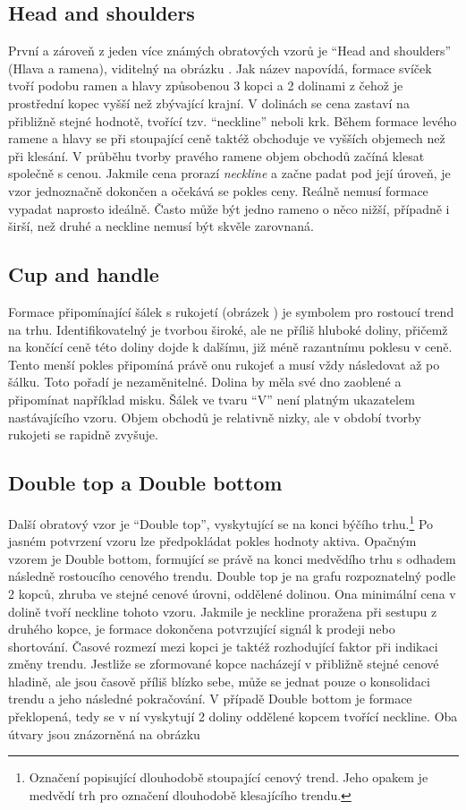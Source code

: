 \subsection{Head and shoulders}
První a zároveň z jeden více známých obratových vzorů je \enquote{Head and shoulders} (Hlava a ramena), viditelný na obrázku \iffalse TODO: Dat obrazek \fi. Jak název napovídá, formace svíček tvoří podobu ramen a hlavy způsobenou
3 kopci a 2 dolinami z čehož je prostřední kopec vyšší než zbývající krajní. V dolinách se cena zastaví na přibližně stejné hodnotě, tvořící tzv. \enquote{neckline} neboli krk.
Během formace levého ramene a hlavy se při stoupající ceně taktéž obchoduje ve vyšších objemech než při klesání. V průběhu tvorby pravého ramene objem obchodů začíná klesat společně s cenou.
Jakmile cena prorazí \emph{neckline} a začne padat pod její úroveň, je vzor jednoznačně dokončen a očekává se pokles ceny. Reálně nemusí formace vypadat naprosto ideálně. Často
může být jedno rameno o něco nižší, případně i širší, než druhé a neckline nemusí být skvěle zarovnaná.


\subsection{Cup and handle}
Formace připomínající šálek s rukojetí (obrázek \iffalse TODO: Ref na obrazek \fi) je symbolem pro rostoucí trend na trhu. Identifikovatelný je tvorbou široké, ale ne příliš hluboké doliny, přičemž na končící ceně této doliny dojde k
dalšímu, již méně razantnímu poklesu v ceně. Tento menší pokles připomíná právě onu rukojeť a musí vždy následovat až po šálku. Toto pořadí je nezaměnitelné. Dolina by měla své dno
zaoblené a připomínat například misku. Šálek ve tvaru \enquote{V} není platným ukazatelem nastávajícího vzoru. Objem obchodů je relativně nizky, ale v období tvorby rukojeti se rapidně zvyšuje.



\subsection{Double top a Double bottom}
Další obratový vzor je \enquote{Double top}, vyskytující se na konci býčího trhu.\footnote{Označení popisující dlouhodobě stoupající cenový trend. Jeho opakem je medvědí trh pro označení
    dlouhodobě klesajícího trendu.} Po jasném potvrzení vzoru lze předpokládat pokles hodnoty aktiva. Opačným vzorem je Double bottom, formující se právě na konci medvědího trhu
s odhadem následně rostoucího cenového trendu. Double top je na grafu rozpoznatelný podle 2 kopců, zhruba ve stejné cenové úrovni, oddělené dolinou. Ona minimální cena v dolině
tvoří neckline tohoto vzoru. Jakmile je neckline proražena při sestupu z druhého kopce, je formace dokončena potvrzující signál k prodeji nebo shortování. Časové rozmezí mezi
kopci je taktéž rozhodující faktor při indikaci změny trendu. Jestliže se zformované kopce nacházejí v přibližně stejné cenové hladině, ale jsou časově příliš blízko sebe, může se jednat
pouze o konsolidaci trendu a jeho následné pokračování.
V případě Double bottom je formace překlopená, tedy se v ní vyskytují 2 doliny oddělené kopcem tvořící neckline. Oba útvary jsou znázorněná na obrázku \iffalse TODO: Pridat \ref{} na obrazek \fi


